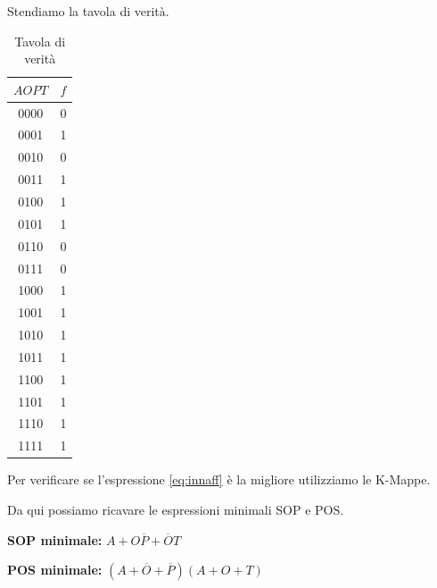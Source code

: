 \begin{exercise}
Stendiamo la tavola di verità.
\begin{table}[ht]
    \centering
    \begin{tabular}{c|c}
         $AOPT$ & $f$\\\hline
         0000 & 0\\
         0001 & 1\\
         0010 & 0\\
         0011 & 1\\\hline
         0100 & 1\\
         0101 & 1\\
         0110 & 0\\
         0111 & 0\\\hline
         1000 & 1\\
         1001 & 1\\
         1010 & 1\\
         1011 & 1\\\hline
         1100 & 1\\
         1101 & 1\\
         1110 & 1\\
         1111 & 1\\
    \end{tabular}
    \caption{Tavola di verità}
\end{table}

Per verificare se l'espressione \ref{eq:innaff} è la migliore utilizziamo le K-Mappe.

Da qui possiamo ricavare le espressioni minimali SOP e POS.

\textbf{SOP minimale:} $A+O\overline{P}+\overline{O}T$

\textbf{POS minimale:} $(A+\overline{O}+\overline{P})(A+O+T)$

\end{exercise}